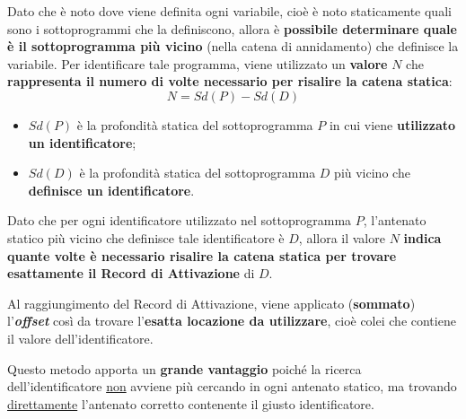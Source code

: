 \documentclass[a4paper]{article}
\begin{document}
	\noindent
	Dato che è noto dove viene definita ogni variabile, cioè è noto staticamente quali sono i sottoprogrammi che la definiscono, allora è \textbf{possibile determinare quale è il sottoprogramma più vicino} (nella catena di annidamento) che definisce la variabile. Per identificare tale programma, viene utilizzato un \textbf{valore} $N$ che \textbf{rappresenta il numero di volte necessario per risalire la catena statica}:
	\begin{equation*}
		N = Sd\left(P\right) - Sd\left(D\right)
	\end{equation*}
	\begin{itemize}
		\item $Sd\left(P\right)$ è la profondità statica del sottoprogramma $P$ in cui viene \textbf{utilizzato un identificatore};
		\item $Sd\left(D\right)$ è la profondità statica del sottoprogramma $D$ più vicino che \textbf{definisce un identificatore}.
	\end{itemize}
	Dato che per ogni identificatore utilizzato nel sottoprogramma $P$, l'antenato statico più vicino che definisce tale identificatore è $D$, allora il valore $N$ \textbf{indica quante volte è necessario risalire la catena statica per trovare esattamente il Record di Attivazione} di $D$.
	
	Al raggiungimento del Record di Attivazione, viene applicato (\textbf{sommato}) l'\emph{\textbf{offset}} così da trovare l'\textbf{esatta locazione da utilizzare}, cioè colei che contiene il valore dell'identificatore.\newline
	
	\noindent
	Questo metodo apporta un \textcolor{Green4}{\textbf{grande vantaggio}} poiché la ricerca dell'identificatore \underline{non} avviene più cercando in ogni antenato statico, ma trovando \underline{direttamente} l'antenato corretto contenente il giusto identificatore.\newpage
	
\end{document}

